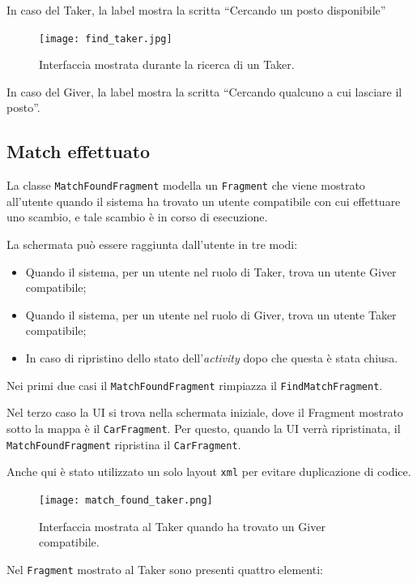 In caso del Taker, la label mostra la scritta ``Cercando un posto disponibile''


\begin{figure}[H]
\centering
\texttt{[image: find\_taker.jpg]}
\caption{Interfaccia mostrata durante la ricerca di un Taker.}
\end{figure}

In caso del Giver, la label mostra la scritta ``Cercando qualcuno a cui lasciare il posto''.

\hypertarget{interfaccia-per-match-effettuato}{%
\subsection{Match effettuato}\label{interfaccia-per-match-effettuato}}

La classe \texttt{MatchFoundFragment} modella un \texttt{Fragment} che viene mostrato all'utente quando il sistema ha trovato un utente compatibile con cui effettuare uno scambio, e tale scambio è in corso di esecuzione.

La schermata può essere raggiunta dall'utente in tre modi:

\begin{itemize}
    \item Quando il sistema, per un utente nel ruolo di Taker, trova un utente Giver compatibile;
    \item Quando il sistema, per un utente nel ruolo di Giver, trova un utente Taker compatibile;
    \item In caso di ripristino dello stato dell'\emph{activity} dopo che questa è stata chiusa.
\end{itemize}
Nei primi due casi il \texttt{MatchFoundFragment} rimpiazza il
\texttt{FindMatchFragment}.

Nel terzo caso la UI si trova nella schermata iniziale, dove il Fragment mostrato sotto la mappa è il \texttt{CarFragment}. Per questo, quando la UI verrà ripristinata, il \texttt{MatchFoundFragment} ripristina il
\texttt{CarFragment}.

Anche qui è stato utilizzato un solo layout \texttt{xml} per evitare duplicazione di codice.


\begin{figure}[H]
\centering
\texttt{[image: match\_found\_taker.png]}
\caption{Interfaccia mostrata al Taker quando ha trovato un
Giver compatibile.}
\label{match-found-taker}
\end{figure}

Nel \texttt{Fragment} mostrato al Taker sono presenti quattro elementi:

